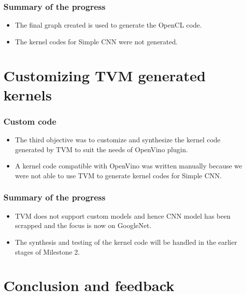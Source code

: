 \documentclass[titlepage]{report}
\begin{document}
\subsection{Summary of the progress}
\begin{itemize}
    \item The final graph created is used to generate the OpenCL code.
    \item The kernel codes for Simple CNN were not generated. 
\end{itemize}

\chapter{ Customizing TVM generated kernels}  

\subsection{Custom code}
\begin{itemize}
    \item The third objective was to customize and synthesize the kernel code generated by TVM to suit the needs of OpenVino plugin.
    \item  A kernel code compatible with OpenVino was written manually because we were not able to use TVM to generate kernel codes for Simple CNN.
    
\end{itemize}
\subsection{Summary of the progress}
\begin{itemize}
\item TVM does not support custom models and hence CNN model has been scrapped and the focus is now on GoogleNet.
\item The synthesis and testing of the kernel code will be handled in the earlier stages of Milestone 2.


\end{itemize}

\chapter{Conclusion and feedback}
\end{document}
